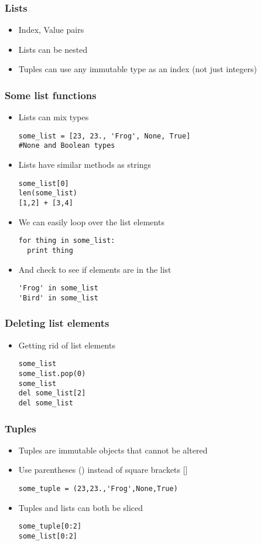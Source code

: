 \documentclass{beamer}
\begin{document}
\begin{frame}[fragile]
\frametitle{Lists}
\begin{itemize}
\item Index, Value pairs
\item Lists can be nested
\item Tuples can use any immutable type as an index (not just integers)
\end{itemize}
\end{frame}

\begin{frame}[fragile]
\frametitle{Some list functions}
\begin{itemize}
\item Lists can mix types
\begin{lstlisting}
some_list = [23, 23., 'Frog', None, True] 
#None and Boolean types
\end{lstlisting}
\item Lists have similar methods as strings
\begin{lstlisting}
some_list[0]
len(some_list)
[1,2] + [3,4]
\end{lstlisting}
\item We can easily loop over the list elements
\begin{lstlisting}
for thing in some_list: 
  print thing
\end{lstlisting}
\item And check to see if elements are in the list
\begin{lstlisting}
'Frog' in some_list
'Bird' in some_list
\end{lstlisting}
\end{itemize}
\end{frame}

\begin{frame}[fragile]
\frametitle{Deleting list elements}
\begin{itemize}
\item Getting rid of list elements
\begin{lstlisting}
some_list
some_list.pop(0)
some_list
del some_list[2]
del some_list
\end{lstlisting}
\end{itemize}
\end{frame}

\begin{frame}[fragile]
\frametitle{Tuples}
\begin{itemize}
\item Tuples are immutable objects that cannot be altered
\item Use parentheses () instead of square brackets []
\begin{lstlisting}
some_tuple = (23,23.,'Frog',None,True)
\end{lstlisting}
\item Tuples and lists can both be sliced
\begin{lstlisting}
some_tuple[0:2]
some_list[0:2]
\end{lstlisting}
\end{itemize}
\end{frame}
\end{document}
